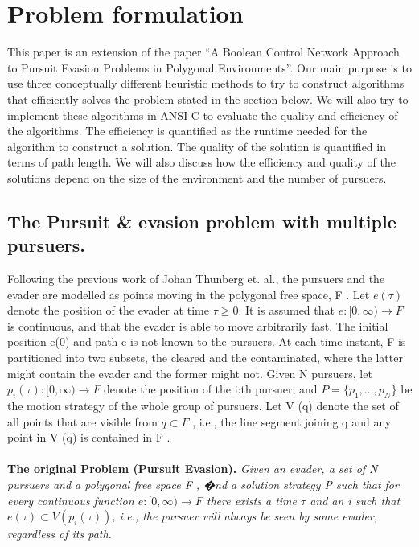 \chapter{Problem formulation}

This paper is an extension of the paper ``A Boolean Control Network Approach to Pursuit Evasion Problems in Polygonal Environments''\cite{paper1}. Our main purpose is to use three conceptually different heuristic methods to try to construct algorithms that efficiently solves the problem stated in the section below. We will also try to implement these algorithms in ANSI C to evaluate the quality and efficiency of the algorithms. The efficiency is quantified as the runtime needed for the algorithm to construct a solution. The quality of the solution is quantified in terms of path length. We will also discuss how the efficiency and quality of the solutions depend on the size of the environment and the number of pursuers.
\section {The Pursuit \& evasion problem with multiple pursuers.}
Following the previous work of Johan Thunberg  et. al.\cite{paper1}, the pursuers and the evader are modelled as points moving in the polygonal free space, F . Let  $e(\tau )$ denote the position of the evader at time $\tau \geq 0$. It is assumed that $e : \lbrack 0, \infty) \to F$ is continuous, and that the evader is able to move arbitrarily fast. The initial position e(0) and path e is not known to the pursuers. At each time instant, F is partitioned into two subsets, the cleared and the contaminated, where the latter might contain the evader and the former might not. Given N pursuers, let $p_i (\tau ) : \lbrack 0, \infty) \to F$ denote the position of the i:th pursuer, and $P = \lbrace p_1 , . . . , p_N \rbrace$ be the motion strategy of the whole group of pursuers. Let V (q) denote the set of all points that are visible from $q \subset F$ , i.e., the line segment joining q and any point in V (q) is contained in F .\\
\\
\textbf{The original Problem (Pursuit Evasion).} \emph{ Given an evader, a set of N pursuers and a polygonal free space F , �nd a solution strategy P such that for every continuous function $e : \lbrack 0, \infty) \to F$ there exists a time $\tau$ and an i such that $e(\tau ) \subset V (p_i (\tau ))$, i.e., the pursuer will always be seen by some evader, regardless of its path. }

